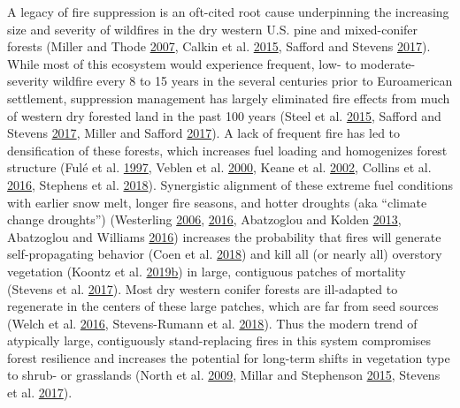 \documentclass[twoside,12pt,final]{ucthesis-CA2012}
\begin{document}
\begin{ucmainmatter}
A legacy of fire suppression is an oft-cited root cause underpinning the
increasing size and severity of wildfires in the dry western U.S. pine
and mixed-conifer forests (Miller and Thode
\protect\hyperlink{ref-miller2007}{2007}, Calkin et al.
\protect\hyperlink{ref-calkin2015}{2015}, Safford and Stevens
\protect\hyperlink{ref-safford2017}{2017}). While most of this ecosystem
would experience frequent, low- to moderate-severity wildfire every 8 to
15 years in the several centuries prior to Euroamerican settlement,
suppression management has largely eliminated fire effects from much of
western dry forested land in the past 100 years (Steel et al.
\protect\hyperlink{ref-steel2015}{2015}, Safford and Stevens
\protect\hyperlink{ref-safford2017}{2017}, Miller and Safford
\protect\hyperlink{ref-miller2017}{2017}). A lack of frequent fire has
led to densification of these forests, which increases fuel loading and
homogenizes forest structure (Fulé et al.
\protect\hyperlink{ref-fule1997}{1997}, Veblen et al.
\protect\hyperlink{ref-veblen2000}{2000}, Keane et al.
\protect\hyperlink{ref-keane2002a}{2002}, Collins et al.
\protect\hyperlink{ref-collins2016}{2016}, Stephens et al.
\protect\hyperlink{ref-stephens2018}{2018}). Synergistic alignment of
these extreme fuel conditions with earlier snow melt, longer fire
seasons, and hotter droughts (aka ``climate change droughts'')
(Westerling \protect\hyperlink{ref-westerling2006}{2006},
\protect\hyperlink{ref-westerling2016}{2016}, Abatzoglou and Kolden
\protect\hyperlink{ref-abatzoglou2013a}{2013}, Abatzoglou and Williams
\protect\hyperlink{ref-abatzoglou2016}{2016}) increases the probability
that fires will generate self-propagating behavior (Coen et al.
\protect\hyperlink{ref-coen2018}{2018}) and kill all (or nearly all)
overstory vegetation (Koontz et al.
\protect\hyperlink{ref-koontz2019a}{2019}\protect\hyperlink{ref-koontz2019a}{b})
in large, contiguous patches of mortality (Stevens et al.
\protect\hyperlink{ref-stevens2017}{2017}). Most dry western conifer
forests are ill-adapted to regenerate in the centers of these large
patches, which are far from seed sources (Welch et al.
\protect\hyperlink{ref-welch2016}{2016}, Stevens-Rumann et al.
\protect\hyperlink{ref-stevens-rumann2018}{2018}). Thus the modern trend
of atypically large, contiguously stand-replacing fires in this system
compromises forest resilience and increases the potential for long-term
shifts in vegetation type to shrub- or grasslands (North et al.
\protect\hyperlink{ref-north2009a}{2009}, Millar and Stephenson
\protect\hyperlink{ref-millar2015}{2015}, Stevens et al.
\protect\hyperlink{ref-stevens2017}{2017}).


\end{ucmainmatter}
\end{document}
